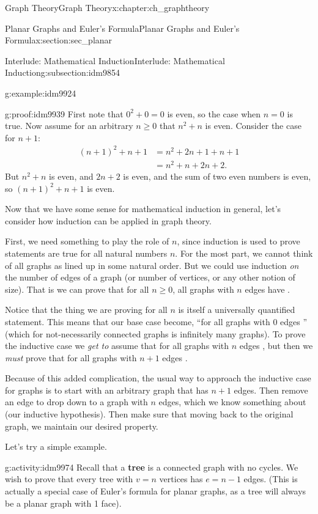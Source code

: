 \documentclass[oneside,10pt,]{book}
\newcommand{\terminology}[1]{\textbf{#1}}
\numberwithin{equation}{chapter}
\newcommand{\amp}{&}
\begin{document}
\begin{chapterptx}{Graph Theory}{}{Graph Theory}{}{}{x:chapter:ch_graphtheory}
\begin{sectionptx}{Planar Graphs and Euler's Formula}{}{Planar Graphs and Euler's Formula}{}{}{x:section:sec_planar}
\begin{subsectionptx}{Interlude: Mathematical Induction}{}{Interlude: Mathematical Induction}{}{}{g:subsection:idm9854}
\begin{example}{}{g:example:idm9924}
\begin{proofptx}{}{g:proof:idm9939}
First note that \(0^2 + 0 = 0\) is even, so the case when \(n = 0\) is true.  Now assume for an arbitrary \(n\ge 0\) that \(n^2 + n\) is even.  Consider the case for \(n+1\):%
\begin{align*}
(n+1)^2 + n+1 \amp = n^2 + 2n + 1 + n + 1\\
\amp = n^2 + n + 2n + 2.
\end{align*}
But \(n^2 + n\) is even, and \(2n + 2\) is even, and the sum of two even numbers is even, so \((n+1)^2 + n+1\) is even.%
\end{proofptx}
\end{example}
Now that we have some sense for mathematical induction in general, let's consider how induction can be applied in graph theory.%
\par
First, we need something to play the role of \(n\), since induction is used to prove statements are true for all natural numbers \(n\).  For the most part, we cannot think of all graphs as lined up in some natural order.  But we could use induction \emph{on} the number of edges of a graph (or number of vertices, or any other notion of size).  That is we can prove that for all \(n\ge 0\), all graphs with \(n\) edges have \textellipsis{}.%
\par
Notice that the thing we are proving for all \(n\) is itself a universally quantified statement. This means that our base case become, ``for all graphs with 0 edges \textellipsis{}'' (which for not-necessarily connected graphs is infinitely many graphs).  To prove the inductive case we \emph{get to} assume that for all graphs with \(n\) edges \textellipsis{}, but then we \emph{must} prove that for all graphs with \(n+1\) edges \textellipsis{}.%
\par
Because of this added complication, the usual way to approach the inductive case for graphs is to start with an arbitrary graph that has \(n+1\) edges.  Then remove an edge to drop down to a graph with \(n\) edges, which we know something about (our inductive hypothesis).  Then make sure that moving back to the original graph, we maintain our desired property.%
\par
Let's try a simple example.%
\begin{activity}{}{g:activity:idm9974}%
Recall that a \terminology{tree} is a connected graph with no cycles.  We wish to prove that every tree with \(v = n\) vertices has \(e = n-1\) edges.  (This is actually a special case of Euler's formula for planar graphs, as a tree will always be a planar graph with 1 face).%

\end{activity}
\end{subsectionptx}
\end{sectionptx}
\end{chapterptx}
\end{document}
